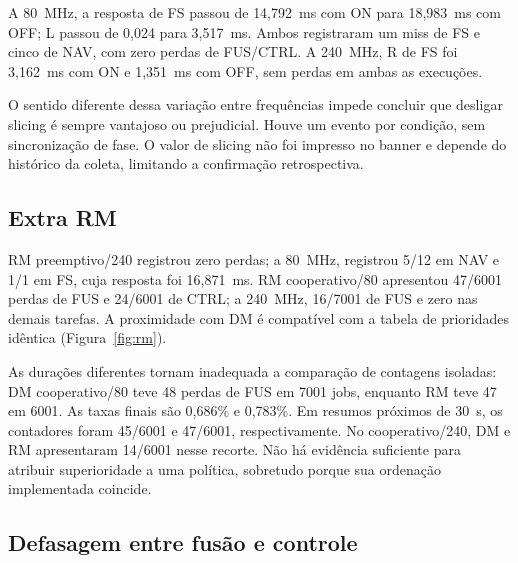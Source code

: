 A 80~MHz, a resposta de FS passou de 14,792~ms com ON para 18,983~ms com OFF; L passou de 0,024 para 3,517~ms. Ambos registraram um miss de FS e cinco de NAV, com zero perdas de FUS/CTRL. A 240~MHz, R de FS foi 3,162~ms com ON e 1,351~ms com OFF, sem perdas em ambas as execuções.

O sentido diferente dessa variação entre frequências impede concluir que desligar slicing é sempre vantajoso ou prejudicial. Houve um evento por condição, sem sincronização de fase. O valor de slicing não foi impresso no banner e depende do histórico da coleta, limitando a confirmação retrospectiva.


\subsection{Extra RM}

RM preemptivo/240 registrou zero perdas; a 80~MHz, registrou 5/12 em NAV e 1/1 em FS, cuja resposta foi 16,871~ms. RM cooperativo/80 apresentou 47/6001 perdas de FUS e 24/6001 de CTRL; a 240~MHz, 16/7001 de FUS e zero nas demais tarefas. A proximidade com DM é compatível com a tabela de prioridades idêntica (Figura~\ref{fig:rm}).

As durações diferentes tornam inadequada a comparação de contagens isoladas: DM cooperativo/80 teve 48 perdas de FUS em 7001 jobs, enquanto RM teve 47 em 6001. As taxas finais são 0,686\% e 0,783\%. Em resumos próximos de 30~s, os contadores foram 45/6001 e 47/6001, respectivamente. No cooperativo/240, DM e RM apresentaram 14/6001 nesse recorte. Não há evidência suficiente para atribuir superioridade a uma política, sobretudo porque sua ordenação implementada coincide.


\subsection{Defasagem entre fusão e controle}

